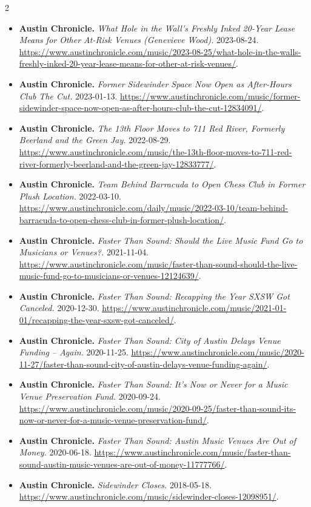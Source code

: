 {\begin{multicols}{2}
\begin{itemize}[itemsep=0pt,topsep=1pt,parsep=0pt,partopsep=0pt,leftmargin=1em]
\item \textbf{Austin Chronicle.} \textit{What Hole in the Wall’s Freshly Inked 20-Year Lease Means for Other At-Risk Venues (Genevieve Wood).} 2023-08-24. \url{https://www.austinchronicle.com/music/2023-08-25/what-hole-in-the-walls-freshly-inked-20-year-lease-means-for-other-at-risk-venues/}.
\item \textbf{Austin Chronicle.} \textit{Former Sidewinder Space Now Open as After-Hours Club The Cut.} 2023-01-13. \url{https://www.austinchronicle.com/music/former-sidewinder-space-now-open-as-after-hours-club-the-cut-12834091/}.
\item \textbf{Austin Chronicle.} \textit{The 13th Floor Moves to 711 Red River, Formerly Beerland and the Green Jay.} 2022-08-29. \url{https://www.austinchronicle.com/music/the-13th-floor-moves-to-711-red-river-formerly-beerland-and-the-green-jay-12833777/}.
\item \textbf{Austin Chronicle.} \textit{Team Behind Barracuda to Open Chess Club in Former Plush Location.} 2022-03-10. \url{https://www.austinchronicle.com/daily/music/2022-03-10/team-behind-barracuda-to-open-chess-club-in-former-plush-location/}.
\item \textbf{Austin Chronicle.} \textit{Faster Than Sound: Should the Live Music Fund Go to Musicians or Venues?.} 2021-11-04. \url{https://www.austinchronicle.com/music/faster-than-sound-should-the-live-music-fund-go-to-musicians-or-venues-12124639/}.
\item \textbf{Austin Chronicle.} \textit{Faster Than Sound: Recapping the Year SXSW Got Canceled.} 2020-12-30. \url{https://www.austinchronicle.com/music/2021-01-01/recapping-the-year-sxsw-got-canceled/}.
\item \textbf{Austin Chronicle.} \textit{Faster Than Sound: City of Austin Delays Venue Funding – Again.} 2020-11-25. \url{https://www.austinchronicle.com/music/2020-11-27/faster-than-sound-city-of-austin-delays-venue-funding-again/}.
\item \textbf{Austin Chronicle.} \textit{Faster Than Sound: It’s Now or Never for a Music Venue Preservation Fund.} 2020-09-24. \url{https://www.austinchronicle.com/music/2020-09-25/faster-than-sound-its-now-or-never-for-a-music-venue-preservation-fund/}.
\item \textbf{Austin Chronicle.} \textit{Faster Than Sound: Austin Music Venues Are Out of Money.} 2020-06-18. \url{https://www.austinchronicle.com/music/faster-than-sound-austin-music-venues-are-out-of-money-11777766/}.
\item \textbf{Austin Chronicle.} \textit{Sidewinder Closes.} 2018-05-18. \url{https://www.austinchronicle.com/music/sidewinder-closes-12098951/}.

\end{itemize}
\end{multicols}}
